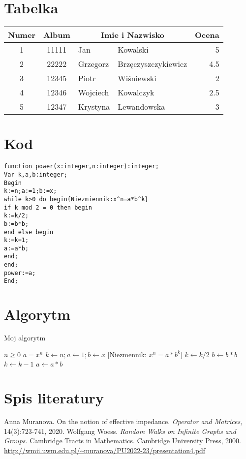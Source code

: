 \documentclass[a4paper, 12pt]{amsart}
\begin{document}
\section{Tabelka}
\begin{tabular}{|c|c|ll|r|}
\hline 
Numer & Album & \multicolumn{2}{|c|}{Imie i Nazwisko} & Ocena\\
\hline\hline
1&11111&Jan&Kowalski&5 \\
\hline
2&22222&Grzegorz&Brzęczyszczykiewicz&4.5 \\
\hline
3&12345&Piotr&Wiśniewski&2\\
\hline
4&12346&Wojciech&Kowalczyk&2.5 \\
\hline
5&12347&Krystyna&Lewandowska&3 \\
\hline
\end{tabular} 
\section{Kod}
\begin{lstlisting}
function power(x:integer,n:integer):integer;
Var k,a,b:integer;
Begin
k:=n;a:=1;b:=x;
while k>0 do begin{Niezmiennik:x^n=a*b^k}
if k mod 2 = 0 then begin
k:=k/2;
b:=b*b;
end else begin
k:=k=1;
a:=a*b;
end;
end;
power:=a;
End;
\end{lstlisting}
\newpage
\section{Algorytm}
\begin{algorithm}
\caption{Moj algorytm}\label{alg:cap}
\begin{algorithmic}
\Require $n \geq 0$
\Ensure $a = x^n$
\State $k \gets n; a \gets 1; b \gets x$
 {[Niezmennik: $x^n = a * b^k$]}
    \State $k \gets k / 2$
    \State $b \gets b * b$
    \State $k \gets k - 1$
    \State $a \gets a * b$
\EndIf
\EndWhile
\end{algorithmic}
\end{algorithm}
\section{Spis literatury}

\begin{thebibliography}{10}
 Anna Muranova. On the notion of effective impedance.
\textit{Operator and Matrices}, 14(3):723-741, 2020.
 Wolfgang Woess. \textit{Random Walks on Infinite Graphs
and Groups}. Cambridge Tracts in Mathematics. Cambridge University Press, 2000. 
\newline
\url{http://wmii.uwm.edu.pl/~muranova/PU2022-23/presentation4.pdf}
\end{thebibliography}
\end{document}
